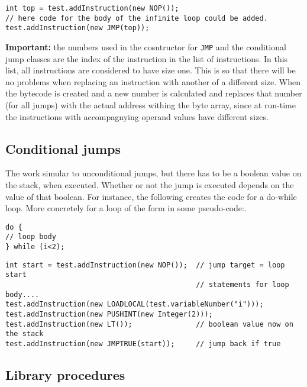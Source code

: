 \documentclass[11pt]{article}
\begin{document}
\begin{lstlisting}
int top = test.addInstruction(new NOP());
// here code for the body of the infinite loop could be added.
test.addInstruction(new JMP(top));
\end{lstlisting}

\textbf{Important:} the numbers used in the cosntructor for \texttt{JMP} and the
conditional jump classes are the index of the instruction in the list of
instructions. In this list, all instructions are considered to have size
one. This is so that there will be no problems when replacing an
instruction with another of a different size. When the bytecode is created
and a new number is calculated and replaces that number (for all jumps)
with the actual address withing the byte array, since at run-time the
instructions with accompagnying operand values have different sizes.

\subsection{Conditional jumps}
\label{sec:org08f6eaa}

The work simular to unconditional jumps, but there has to be a boolean
value on the stack, when executed.  Whether or not the jump is executed
depends on the value of that boolean. For instance, the following creates
the code for a do-while loop. More concretely for a loop of the form in
some pseudo-code:.

\begin{verbatim}
do {
// loop body
} while (i<2);
\end{verbatim}




\begin{lstlisting}
int start = test.addInstruction(new NOP());  // jump target = loop start
                                             // statements for loop body....
test.addInstruction(new LOADLOCAL(test.variableNumber("i")));
test.addInstruction(new PUSHINT(new Integer(2)));
test.addInstruction(new LT());               // boolean value now on the stack
test.addInstruction(new JMPTRUE(start));     // jump back if true		    
\end{lstlisting}


\subsection{Library procedures}
\label{sec:org730892e}
\label{org1c2cbfd}
\end{document}
